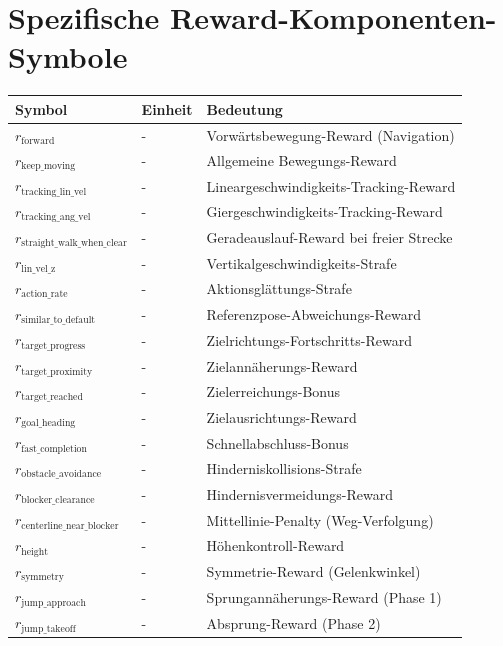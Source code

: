 \section{Spezifische Reward-Komponenten-Symbole}

\begin{table}[htbp]
	\centering
	\begin{tabular}{lll}
		\toprule
		\textbf{Symbol} & \textbf{Einheit} & \textbf{Bedeutung} \\
		\midrule
		$r_{\text{forward}}$ & - & Vorwärtsbewegung-Reward (Navigation) \\
		$r_{\text{keep_moving}}$ & - & Allgemeine Bewegungs-Reward \\
		$r_{\text{tracking_lin_vel}}$ & - & Lineargeschwindigkeits-Tracking-Reward \\
		$r_{\text{tracking_ang_vel}}$ & - & Giergeschwindigkeits-Tracking-Reward \\
		$r_{\text{straight_walk_when_clear}}$ & - & Geradeauslauf-Reward bei freier Strecke \\
		$r_{\text{lin_vel_z}}$ & - & Vertikalgeschwindigkeits-Strafe \\
		$r_{\text{action_rate}}$ & - & Aktionsglättungs-Strafe \\
		$r_{\text{similar_to_default}}$ & - & Referenzpose-Abweichungs-Reward \\
		$r_{\text{target_progress}}$ & - & Zielrichtungs-Fortschritts-Reward \\
		$r_{\text{target_proximity}}$ & - & Zielannäherungs-Reward \\
		$r_{\text{target_reached}}$ & - & Zielerreichungs-Bonus \\
		$r_{\text{goal_heading}}$ & - & Zielausrichtungs-Reward \\
		$r_{\text{fast_completion}}$ & - & Schnellabschluss-Bonus \\
		$r_{\text{obstacle_avoidance}}$ & - & Hinderniskollisions-Strafe \\
		$r_{\text{blocker_clearance}}$ & - & Hindernisvermeidungs-Reward \\
		$r_{\text{centerline\_near\_blocker}}$ & - & Mittellinie-Penalty (Weg-Verfolgung) \\
		$r_{\text{height}}$ & - & Höhenkontroll-Reward \\
		$r_{\text{symmetry}}$ & - & Symmetrie-Reward (Gelenkwinkel) \\
		$r_{\text{jump_approach}}$ & - & Sprungannäherungs-Reward (Phase 1) \\
		$r_{\text{jump_takeoff}}$ & - & Absprung-Reward (Phase 2) \\

\end{tabular}
\end{table}
